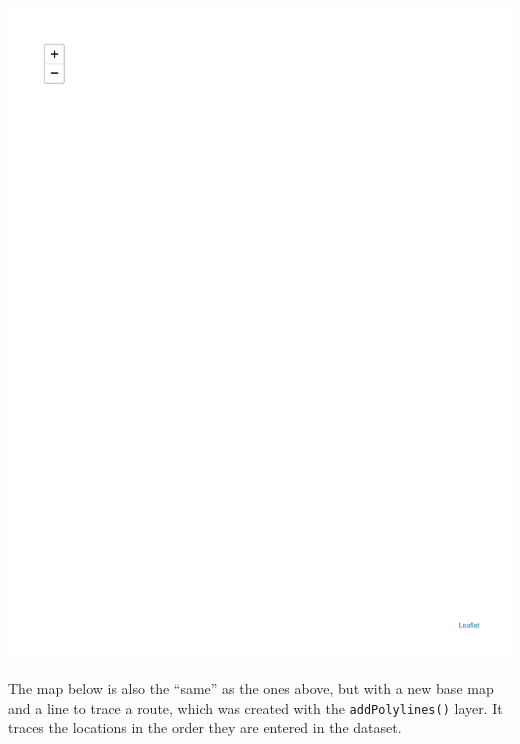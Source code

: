 \documentclass[
  letterpaper,
  DIV=11,
  numbers=noendperiod]{scrreprt}
\newenvironment{Shaded}{\begin{snugshade}}{\end{snugshade}}
\newcommand{\AttributeTok}[1]{\textcolor[rgb]{0.40,0.45,0.13}{#1}}
\newcommand{\DecValTok}[1]{\textcolor[rgb]{0.68,0.00,0.00}{#1}}
\newcommand{\FunctionTok}[1]{\textcolor[rgb]{0.28,0.35,0.67}{#1}}
\newcommand{\NormalTok}[1]{\textcolor[rgb]{0.00,0.23,0.31}{#1}}
\newcommand{\SpecialCharTok}[1]{\textcolor[rgb]{0.37,0.37,0.37}{#1}}
\newcommand{\StringTok}[1]{\textcolor[rgb]{0.13,0.47,0.30}{#1}}
\begin{document}
\includegraphics{src/06-Spatial_Viz_files/figure-pdf/unnamed-chunk-25-1.pdf}

The map below is also the ``same'' as the ones above, but with a new
base map and a line to trace a route, which was created with the
\texttt{addPolylines()} layer. It traces the locations in the order they
are entered in the dataset.

\begin{Shaded}
\end{Shaded}
\end{document}
